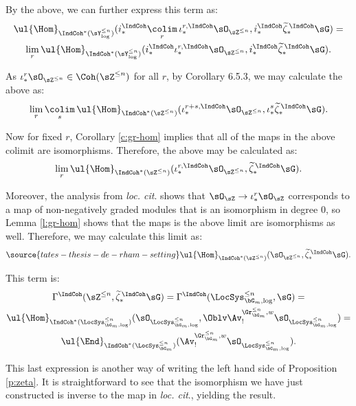  By the above, we can further express this term as:
%
\[
\begin{gathered}
\ul{\Hom}_{\IndCoh^*(\sY_{\log}^{\leq n})}
(i_*^{\IndCoh}\underset{r}{\colim} \, \iota_*^{r,\IndCoh} \sO_{\sZ^{\leq n}},
i_*^{\IndCoh}\widetilde{\zeta}_*^{\,\IndCoh}\sG) = \\
\underset{r}{\lim} \, \ul{\Hom}_{\IndCoh^*(\sY_{\log}^{\leq n})}
(i_*^{\IndCoh} \iota_*^{r,\IndCoh} \sO_{\sZ^{\leq n}},
i_*^{\IndCoh}\widetilde{\zeta}_*^{\,\IndCoh}\sG).
\end{gathered}
\]

 As $\iota_*^r \sO_{\sZ^{\leq n}} \in \Coh(\sZ^{\leq n})$ for all $r$,
by \cite{cpsii} Corollary 6.5.3, we may calculate the above as:
%
\[
\underset{r}{\lim} \,
\underset{s}{\colim} \,
\ul{\Hom}_{\IndCoh^*(\sZ^{\leq n})}
(\iota_*^{r+s,\IndCoh} \sO_{\sZ^{\leq n}},
\iota_*^s\widetilde{\zeta}_*^{\,\IndCoh}\sG).
\]

Now for fixed $r$, Corollary \ref{c:gr-hom} implies that all of the
maps in the above colimit are isomorphisms. Therefore, the above
may be calculated as:
%
\[
\underset{r}{\lim} \,
\ul{\Hom}_{\IndCoh^*(\sZ^{\leq n})}
(\iota_*^{r,\IndCoh} \sO_{\sZ^{\leq n}},
\widetilde{\zeta}_*^{\,\IndCoh}\sG).
\]

 Moreover, the analysis from \emph{loc. cit}. shows that
$\sO_{\sZ} \to \iota_*^r\sO_{\sZ}$ corresponds to a map of
non-negatively graded modules that is an isomorphism in degree $0$,
so Lemma \ref{l:gr-hom} shows that the maps is the above
limit are isomorphisms as well. Therefore, we may calculate this
limit as:
%
\begin{equation}\label{eq:no-r-s}
\source{tates-thesis-de-rham-setting}
\ul{\Hom}_{\IndCoh^*(\sZ^{\leq n})}
(\sO_{\sZ^{\leq n}},
\widetilde{\zeta}_*^{\,\IndCoh}\sG).
\end{equation}

 This term is:
%
\[
\begin{gathered}
\Gamma^{\IndCoh}(\sZ^{\leq n},\widetilde{\zeta}_*^{\,\IndCoh}\sG) =
\Gamma^{\IndCoh}(\LocSys_{\bG_m,\log}^{\leq n},\sG) = \\
\ul{\Hom}_{\IndCoh^*(\LocSys_{\bG_m,\log}^{\leq n})}
(\sO_{\LocSys_{\bG_m,\log}^{\leq n}},\Oblv\Av_!^{\Gr_{\bG_m}^{\leq n},w}
\sO_{\LocSys_{\bG_m,\log}^{\leq n}}) = \\
\ul{\End}_{\IndCoh^*(\LocSys_{\bG_m}^{\leq n})}
(\Av_!^{\Gr_{\bG_m}^{\leq n},w}
\sO_{\LocSys_{\bG_m,\log}^{\leq n}}).
\end{gathered}
\]

 This last expression is another way of writing the left hand side
of Proposition \ref{p:zeta}. It is straightforward to see that the isomorphism
we have just constructed is inverse to the map in \emph{loc. cit}., yielding the result.


